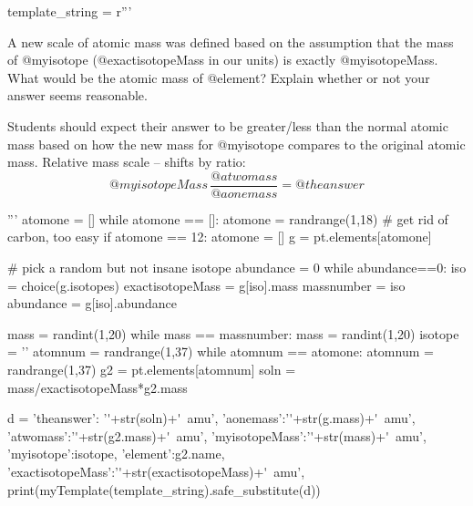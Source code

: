 


\begin{pycode}
template_string = r'''


A new scale of atomic mass was defined based on the assumption 
that the mass of @myisotope (@exactisotopeMass in our units) is exactly 
@myisotopeMass. What would be the atomic mass of @element? Explain 
whether or not your answer seems reasonable. 
\answerline[@theanswer] 


\begin{solution}
Students should expect their answer to be greater/less than the normal 
atomic mass based on how the new mass for @myisotope{} compares to the 
original atomic mass. Relative mass scale -- shifts by ratio: 
\[@myisotopeMass\,\frac{@atwomass}{@aonemass}=@theanswer\]
\end{solution}
  
'''
atomone = []
while atomone == []: 
    atomone = randrange(1,18)
    # get rid of carbon, too easy
    if atomone == 12:
        atomone = []
g = pt.elements[atomone]

# pick a random but not insane isotope
abundance = 0
while abundance==0:
    iso = choice(g.isotopes)
    exactisotopeMass = g[iso].mass
    massnumber = iso
    abundance = g[iso].abundance

mass = randint(1,20)
while mass == massnumber:
    mass = randint(1,20)
isotope = ''
atomnum = randrange(1,37)
while atomnum == atomone:
    atomnum = randrange(1,37)
g2 = pt.elements[atomnum]
soln = mass/exactisotopeMass*g2.mass

d = {'theanswer': '\SI{'+str(soln)+'}{amu}',
  'aonemass':'\SI{'+str(g.mass)+'}{amu}',
  'atwomass':'\SI{'+str(g2.mass)+'}{amu}',
  'myisotopeMass':'\SI{'+str(mass)+'}{amu}',
  'myisotope':isotope,
  'element':g2.name,
  'exactisotopeMass':'\SI{'+str(exactisotopeMass)+'}{amu}',
      }
print(myTemplate(template_string).safe_substitute(d))
\end{pycode}

